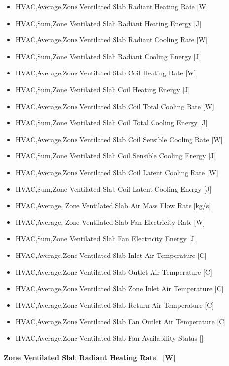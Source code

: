 \begin{itemize}
\item
  HVAC,Average,Zone Ventilated Slab Radiant Heating Rate {[}W{]}
\item
  HVAC,Sum,Zone Ventilated Slab Radiant Heating Energy {[}J{]}
\item
  HVAC,Average,Zone Ventilated Slab Radiant Cooling Rate {[}W{]}
\item
  HVAC,Sum,Zone Ventilated Slab Radiant Cooling Energy {[}J{]}
\item
  HVAC,Average,Zone Ventilated Slab Coil Heating Rate {[}W{]}
\item
  HVAC,Sum,Zone Ventilated Slab Coil Heating Energy {[}J{]}
\item
  HVAC,Average,Zone Ventilated Slab Coil Total Cooling Rate {[}W{]}
\item
  HVAC,Sum,Zone Ventilated Slab Coil Total Cooling Energy {[}J{]}
\item
  HVAC,Average,Zone Ventilated Slab Coil Sensible Cooling Rate {[}W{]}
\item
  HVAC,Sum,Zone Ventilated Slab Coil Sensible Cooling Energy {[}J{]}
\item
  HVAC,Average,Zone Ventilated Slab Coil Latent Cooling Rate {[}W{]}
\item
  HVAC,Sum,Zone Ventilated Slab Coil Latent Cooling Energy {[}J{]}
\item
  HVAC,Average, Zone Ventilated Slab Air Mass Flow Rate {[}kg/s{]}
\item
  HVAC,Average, Zone Ventilated Slab Fan Electricity Rate {[}W{]}
\item
  HVAC,Sum,Zone Ventilated Slab Fan Electricity Energy {[}J{]}
\item
  HVAC,Average,Zone Ventilated Slab Inlet Air Temperature {[}C{]}
\item
  HVAC,Average,Zone Ventilated Slab Outlet Air Temperature {[}C{]}
\item
  HVAC,Average,Zone Ventilated Slab Zone Inlet Air Temperature {[}C{]}
\item
  HVAC,Average,Zone Ventilated Slab Return Air Temperature {[}C{]}
\item
  HVAC,Average,Zone Ventilated Slab Fan Outlet Air Temperature {[}C{]}
\item
  HVAC,Average,Zone Ventilated Slab Fan Availability Status {[]}
\end{itemize}

\paragraph{Zone Ventilated Slab Radiant Heating Rate~ {[}W{]}}\label{zone-ventilated-slab-radiant-heating-rate-w}

